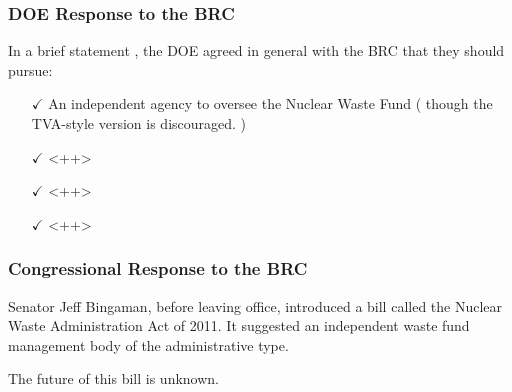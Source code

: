 \begin{frame}[ctb!]
    \frametitle{DOE Response to the BRC}

    In a brief statement \cite{doe_strategy_2011}, the DOE agreed in general 
    with the BRC that they should pursue:

    \begin{itemize}
      \item[$\checkmark$] An independent agency to oversee the Nuclear Waste 
        Fund ( though the TVA-style version is discouraged. )
      \item[$\checkmark$] <++> 
      \item[$\checkmark$] <++> 
      \item[$\checkmark$] <++> 
    \end{itemize}
  \end{frame}

\begin{frame}[ctb!]
    \frametitle{Congressional Response to the BRC}
    Senator Jeff Bingaman, before leaving office, introduced a bill called the 
    Nuclear Waste Administration Act of 2011. It suggested an independent waste 
    fund management body of the administrative type. 

    The future of this bill is unknown. 
  \end{frame}

